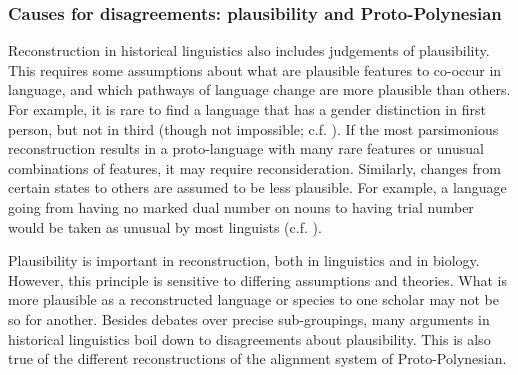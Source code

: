 \documentclass[draft,10pt]{article} %
\begin{document}




\subsubsection{Causes for disagreements: plausibility and Proto-Polynesian}
Reconstruction in historical linguistics also includes judgements of plausibility. This requires some assumptions about what are plausible features to co-occur in language, and which pathways of language change are more plausible than others. For example, it is rare to find a language that has a gender distinction in first person, but not in third (though not impossible; c.f. \citet{wals-44}). If the most parsimonious reconstruction results in a proto-language with many rare features or unusual combinations of features, it may require reconsideration. Similarly, changes from certain states to others are assumed to be less plausible. For example, a language going from having no marked dual number on nouns to having trial number would be taken as unusual by most linguists (c.f. \citet[8]{kikusawa_2006_pro_number}). 

Plausibility is important in reconstruction, both in linguistics and in biology. However, this principle is sensitive to differing assumptions and theories. What is more plausible as a reconstructed language or species to one scholar may not be so for another. Besides debates over precise sub-groupings, many arguments in historical linguistics boil down to disagreements about plausibility. This is also true of the different reconstructions of the alignment system of Proto-Polynesian.
\end{document}
